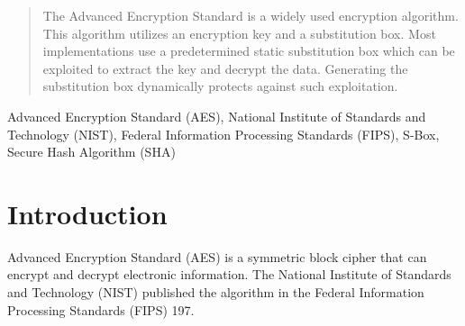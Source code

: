 \documentclass[journal]{IEEEtran}
\begin{document}
\maketitle

\begin{abstract}
The Advanced Encryption Standard is a widely used encryption algorithm. This algorithm utilizes an encryption key and a substitution box. Most implementations use a predetermined static substitution box which can be exploited to extract the key and decrypt the data. Generating the substitution box dynamically protects against such exploitation. 
\end{abstract}

\begin{IEEEkeywords}
Advanced Encryption Standard (AES), National Institute of Standards and Technology (NIST), Federal Information Processing Standards (FIPS), S-Box, Secure Hash Algorithm (SHA)
\end{IEEEkeywords}

%
\IEEEpeerreviewmaketitle

\section{Introduction}
% 
% 
% 
% 
 Advanced Encryption Standard (AES) is a symmetric block cipher that can encrypt and 
decrypt electronic information. The National Institute of Standards and Technology (NIST) published the 
algorithm in the Federal Information Processing Standards (FIPS) 197.
\end{document}
